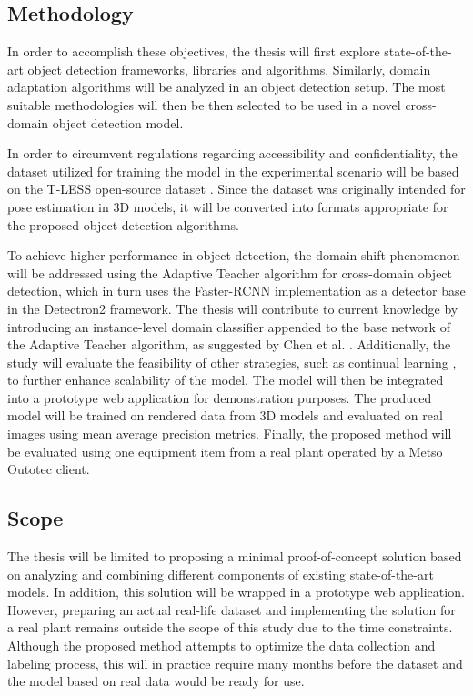 \subsection{Methodology}
In order to accomplish these objectives, the thesis will first explore state-of-the-art object detection frameworks, libraries and algorithms. Similarly, domain adaptation algorithms will be analyzed in an object detection setup. The most suitable methodologies will then be then selected to be used in a novel cross-domain object detection model.  

In order to circumvent regulations regarding accessibility and confidentiality, the dataset utilized for training the model in the experimental scenario will be based on the T-LESS open-source dataset \cite{hodan2017tless}. Since the dataset was originally intended for pose estimation in 3D models, it will be converted into formats appropriate for the proposed object detection algorithms.

To achieve higher performance in object detection, the domain shift phenomenon will be addressed using the Adaptive Teacher \cite{Li2021} algorithm for cross-domain object detection, which in turn uses the Faster-RCNN \cite{ima} implementation as a detector base in the Detectron2 \cite{wu2019Detectron2} framework.  The thesis will contribute to current knowledge by introducing an instance-level domain classifier appended to the base network of the Adaptive Teacher algorithm, as suggested by Chen et al. \cite{Chen2018}. Additionally, the study will evaluate the feasibility of other strategies, such as continual learning \cite{Parisi2018}, to further enhance scalability of the model. The model will then be integrated into a prototype web application for demonstration purposes. The produced model will be trained on rendered data from 3D models and evaluated on real images using mean average precision metrics. Finally, the proposed method will be evaluated using one equipment item from a real plant operated by a Metso Outotec client.

\clearpage

\subsection{Scope}

The thesis will be limited to proposing a minimal proof-of-concept solution based on analyzing and combining different components of existing state-of-the-art models. In addition, this solution will be wrapped in a prototype web application. However, preparing an actual real-life dataset and implementing the solution for a real plant remains outside the scope of this study due to the time constraints. Although the proposed method attempts to optimize the data collection and labeling process, this will in practice require many months before the dataset and the model based on real data would be ready for use. 


